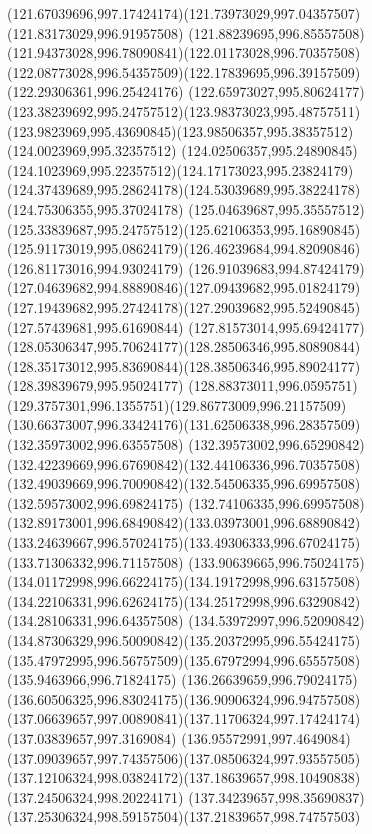 {    \curveto(121.67039696,997.17424174)(121.73973029,997.04357507)(121.83173029,996.91957508)
    \curveto(121.88239695,996.85557508)(121.94373028,996.78090841)(122.01173028,996.70357508)
    \curveto(122.08773028,996.54357509)(122.17839695,996.39157509)(122.29306361,996.25424176)
    \curveto(122.65973027,995.80624177)(123.38239692,995.24757512)(123.98373023,995.48757511)
    \curveto(123.9823969,995.43690845)(123.98506357,995.38357512)(124.0023969,995.32357512)
    \curveto(124.02506357,995.24890845)(124.1023969,995.22357512)(124.17173023,995.23824179)
    \curveto(124.37439689,995.28624178)(124.53039689,995.38224178)(124.75306355,995.37024178)
    \curveto(125.04639687,995.35557512)(125.33839687,995.24757512)(125.62106353,995.16890845)
    \curveto(125.91173019,995.08624179)(126.46239684,994.82090846)(126.81173016,994.93024179)
    \curveto(126.91039683,994.87424179)(127.04639682,994.88890846)(127.09439682,995.01824179)
    \curveto(127.19439682,995.27424178)(127.29039682,995.52490845)(127.57439681,995.61690844)
    \curveto(127.81573014,995.69424177)(128.05306347,995.70624177)(128.28506346,995.80890844)
    \curveto(128.35173012,995.83690844)(128.38506346,995.89024177)(128.39839679,995.95024177)
    \curveto(128.88373011,996.0595751)(129.3757301,996.1355751)(129.86773009,996.21157509)
    \curveto(130.66373007,996.33424176)(131.62506338,996.28357509)(132.35973002,996.63557508)
    \curveto(132.39573002,996.65290842)(132.42239669,996.67690842)(132.44106336,996.70357508)
    \curveto(132.49039669,996.70090842)(132.54506335,996.69957508)(132.59573002,996.69824175)
    \curveto(132.74106335,996.69957508)(132.89173001,996.68490842)(133.03973001,996.68890842)
    \curveto(133.24639667,996.57024175)(133.49306333,996.67024175)(133.71306332,996.71157508)
    \curveto(133.90639665,996.75024175)(134.01172998,996.66224175)(134.19172998,996.63157508)
    \curveto(134.22106331,996.62624175)(134.25172998,996.63290842)(134.28106331,996.64357508)
    \curveto(134.53972997,996.52090842)(134.87306329,996.50090842)(135.20372995,996.55424175)
    \curveto(135.47972995,996.56757509)(135.67972994,996.65557508)(135.9463966,996.71824175)
    \curveto(136.26639659,996.79024175)(136.60506325,996.83024175)(136.90906324,996.94757508)
    \curveto(137.06639657,997.00890841)(137.11706324,997.17424174)(137.03839657,997.3169084)
    \curveto(136.95572991,997.4649084)(137.09039657,997.74357506)(137.08506324,997.93557505)
    \curveto(137.12106324,998.03824172)(137.18639657,998.10490838)(137.24506324,998.20224171)
    \curveto(137.34239657,998.35690837)(137.25306324,998.59157504)(137.21839657,998.74757503)
}
